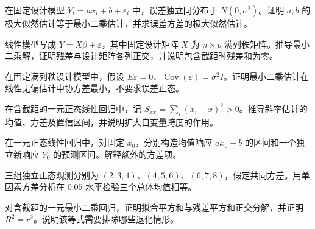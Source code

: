 \begin{exercise}[正态误差下的最小二乘与似然]\label{q:M-C26-2d}
在固定设计模型 $Y_i=ax_i+b+\varepsilon_i$ 中，误差独立同分布于 $N(0,\sigma^2)$。证明 $a,b$ 的极大似然估计等于最小二乘估计，并求误差方差的极大似然估计。\par{}\end{exercise}

\begin{exercise}[正规方程与残差正交]\label{q:B16.1}
线性模型写成 $Y=X\beta+\varepsilon$，其中固定设计矩阵 $X$ 为 $n\times p$ 满列秩矩阵。推导最小二乘解，证明残差与设计矩阵各列正交，并说明包含截距时残差和为零。\par{}\end{exercise}

\begin{exercise}[高斯—马尔可夫最优性]\label{q:B16.2}
在固定满列秩设计模型中，假设 $E\varepsilon=0$、$\operatorname{Cov}(\varepsilon)=\sigma^2I$。证明最小二乘估计在线性无偏估计中协方差最小，不要求误差正态。\par{}\end{exercise}

\begin{exercise}[斜率估计的方差与区间]\label{q:B16.3}
在含截距的一元正态线性回归中，记 $S_{xx}=\sum_i(x_i-\overline x)^2>0$。推导斜率估计的均值、方差及置信区间，并说明扩大自变量跨度的作用。\par{}\end{exercise}

\begin{exercise}[均值响应区间与预测区间]\label{q:B16.4}
在一元正态线性回归中，对固定 $x_0$，分别构造均值响应 $a x_0+b$ 的区间和一个独立新响应 $Y_0$ 的预测区间。解释额外的方差项。\par{}\end{exercise}

\begin{exercise}[单因素方差分析]\label{q:B16.5}
三组独立正态观测分别为 $(2,3,4)$、$(4,5,6)$、$(6,7,8)$，假定共同方差。用单因素方差分析在 $0.05$ 水平检验三个总体均值相等。\par{}\end{exercise}

\begin{exercise}[相关系数与回归解释度]\label{q:B16.6}
对含截距的一元最小二乘回归，证明拟合平方和与残差平方和正交分解，并证明 $R^2=r^2$。说明该等式需要排除哪些退化情形。\par{}\end{exercise}

